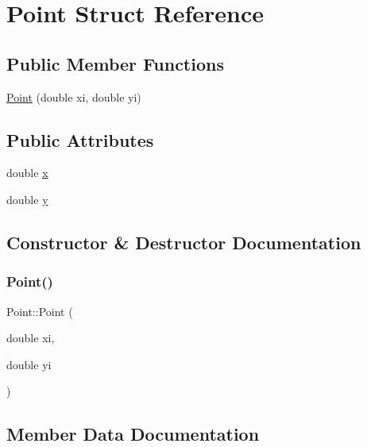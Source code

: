 \hypertarget{struct_point}{}\section{Point Struct Reference}
\label{struct_point}
\subsection*{Public Member Functions}
\begin{DoxyCompactItemize}
\item 
\mbox{\hyperlink{struct_point_ad13b5d2c46ae171a0a7d9eac45f599c6}{Point}} (double xi, double yi)
\end{DoxyCompactItemize}
\subsection*{Public Attributes}
\begin{DoxyCompactItemize}
\item 
double \mbox{\hyperlink{struct_point_ab99c56589bc8ad5fa5071387110a5bc7}{x}}
\item 
double \mbox{\hyperlink{struct_point_afa38be143ae800e6ad69ce8ed4df62d8}{y}}
\end{DoxyCompactItemize}


\subsection{Constructor \& Destructor Documentation}
\mbox{\label{struct_point_ad13b5d2c46ae171a0a7d9eac45f599c6}} 
\subsubsection{\texorpdfstring{Point()}{Point()}}
{\footnotesize\ttfamily Point\+::\+Point (\begin{DoxyParamCaption}\item[{double}]{xi,  }\item[{double}]{yi }\end{DoxyParamCaption})\hspace{0.3cm}{\ttfamily [inline]}}



\subsection{Member Data Documentation}
\mbox{\label{struct_point_ab99c56589bc8ad5fa5071387110a5bc7}} 
